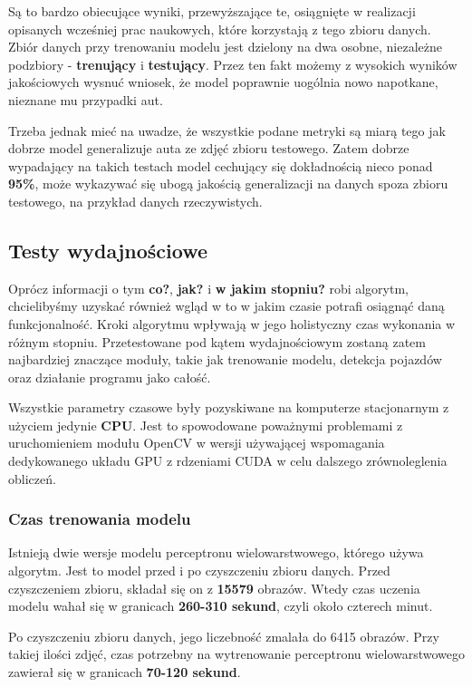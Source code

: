 \pagebreak

Są to bardzo obiecujące wyniki, przewyższające te, osiągnięte w realizacji opisanych wcześniej prac naukowych, które korzystają z tego zbioru danych. Zbiór danych przy trenowaniu modelu jest dzielony na dwa osobne, niezależne podzbiory - \textbf{trenujący} i \textbf{testujący}. Przez ten fakt możemy z wysokich wyników jakościowych wysnuć wniosek, że model poprawnie uogólnia nowo napotkane, nieznane mu przypadki aut.

Trzeba jednak mieć na uwadze, że wszystkie podane metryki są miarą tego jak dobrze model generalizuje auta ze zdjęć zbioru testowego. Zatem dobrze wypadający na takich testach model cechujący się dokładnością nieco ponad \textbf{95\%}, może wykazywać się ubogą jakością generalizacji na danych spoza zbioru testowego, na przykład danych rzeczywistych.

\subsection{Testy wydajnościowe}
Oprócz informacji o tym \textbf{co?}, \textbf{jak?} i \textbf{w jakim stopniu?} robi algorytm, chcielibyśmy uzyskać również wgląd w to w jakim czasie potrafi osiągnąć daną funkcjonalność. Kroki algorytmu wpływają w jego holistyczny czas wykonania w różnym stopniu. Przetestowane pod kątem wydajnościowym zostaną zatem najbardziej znaczące moduły, takie jak trenowanie modelu, detekcja pojazdów oraz działanie programu jako całość.

Wszystkie parametry czasowe były pozyskiwane na komputerze stacjonarnym z użyciem jedynie \textbf{CPU}. Jest to spowodowane poważnymi problemami z uruchomieniem modułu OpenCV w wersji używającej wspomagania dedykowanego układu GPU z rdzeniami CUDA w celu dalszego zrównoleglenia obliczeń. 

\subsubsection{Czas trenowania modelu}
Istnieją dwie wersje modelu perceptronu wielowarstwowego, którego używa algorytm. Jest to model przed i po czyszczeniu zbioru danych. Przed czyszczeniem zbioru, składał się on z \textbf{15579} obrazów. Wtedy czas uczenia modelu wahał się w granicach \textbf{260-310 sekund}, czyli około czterech minut.

Po czyszczeniu zbioru danych, jego liczebność zmalała do 6415 obrazów. Przy takiej ilości zdjęć, czas potrzebny na wytrenowanie perceptronu wielowarstwowego zawierał się w granicach \textbf{70-120 sekund}.

